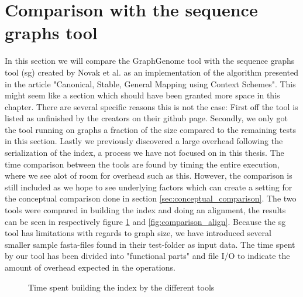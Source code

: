 \documentclass[thesis.tex]{subfiles}
\begin{document}
\section{Comparison with the sequence graphs tool}
In this section we will compare the GraphGenome tool with the sequence graphs tool (sg) created by Novak et al. as an implementation of the algorithm presented in the article "Canonical, Stable, General Mapping using Context Schemes". This might seem like a section which should have been granted more space in this chapter. There are several specific reasons this is not the case: First off the tool is listed as unfinished by the creators on their github page. Secondly, we only got the tool running on graphs a fraction of the size compared to the remaining tests in this section. Lastly we previously discovered a large overhead following the serialization of the index, a process we have not focused on in this thesis. The time comparison between the tools are found by timing the entire execution, where we see alot of room for overhead such as this. However, the comparison is still included as we hope to see underlying factors which can create a setting for the conceptual comparison done in section \ref{sec:conceptual_comparison}. The two tools were compared in building the index and doing an alignment, the results can be seen in respectively figure \ref{fig:comparison_build} and \ref{fig:comparison_align}. Because the sg tool has limitations with regards to graph size, we have introduced several smaller sample fasta-files found in their test-folder as input data. The time spent by our tool has been divided into "functional parts" and file I/O to indicate the amount of overhead expected in the operations.
\label{sec:comparison_tools}
\begin{figure}[!hb]
  \caption{Time spent building the index by the different tools}
  \label{fig:comparison_build}
\end{figure}
\end{document}
